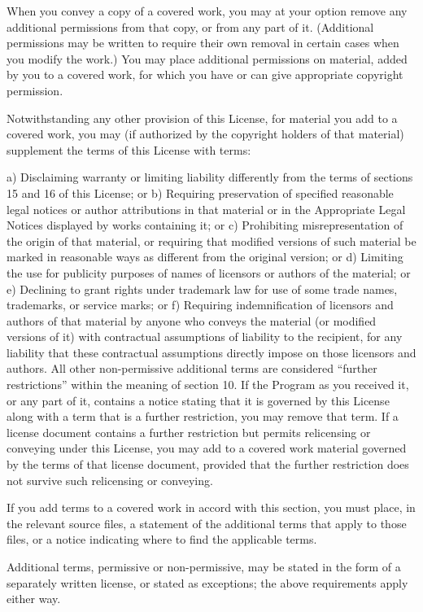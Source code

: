 \documentclass[11pt]{article}
\begin{document}
When you convey a copy of a covered work, you may at your option remove any additional permissions from that copy, or from any part of it. (Additional permissions may be written to require their own removal in certain cases when you modify the work.) You may place additional permissions on material, added by you to a covered work, for which you have or can give appropriate copyright permission.

Notwithstanding any other provision of this License, for material you add to a covered work, you may (if authorized by the copyright holders of that material) supplement the terms of this License with terms:

a) Disclaiming warranty or limiting liability differently from the terms of sections 15 and 16 of this License; or
b) Requiring preservation of specified reasonable legal notices or author attributions in that material or in the Appropriate Legal Notices displayed by works containing it; or
c) Prohibiting misrepresentation of the origin of that material, or requiring that modified versions of such material be marked in reasonable ways as different from the original version; or
d) Limiting the use for publicity purposes of names of licensors or authors of the material; or
e) Declining to grant rights under trademark law for use of some trade names, trademarks, or service marks; or
f) Requiring indemnification of licensors and authors of that material by anyone who conveys the material (or modified versions of it) with contractual assumptions of liability to the recipient, for any liability that these contractual assumptions directly impose on those licensors and authors.
All other non-permissive additional terms are considered “further restrictions” within the meaning of section 10. If the Program as you received it, or any part of it, contains a notice stating that it is governed by this License along with a term that is a further restriction, you may remove that term. If a license document contains a further restriction but permits relicensing or conveying under this License, you may add to a covered work material governed by the terms of that license document, provided that the further restriction does not survive such relicensing or conveying.

If you add terms to a covered work in accord with this section, you must place, in the relevant source files, a statement of the additional terms that apply to those files, or a notice indicating where to find the applicable terms.

Additional terms, permissive or non-permissive, may be stated in the form of a separately written license, or stated as exceptions; the above requirements apply either way.
\end{document}
